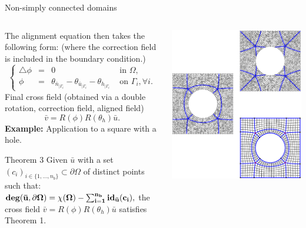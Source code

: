 \documentclass[compress,10pt,aspectratio=169]{beamer}
\begin{document}
\begin{frame}{Non-simply connected domains}

\vspace{-0.3cm}
\small
\begin{columns}
\begin{column}{0.68\textwidth}
The alignment equation then takes the following form: {\color{onera_gray} (where the correction field is included in the boundary condition.)}
\begin{equation*}
\left\{
\begin{array}{lcll}
    \triangle\phi& =& 0& \mbox{ in }\Omega,\\[0.25cm]
    \phi &=& \theta_{\bar{n}_{|\Gamma_i}}-\theta_{\bar{u}_{|\Gamma_i}}-\theta_{h_{|\Gamma_i}}& \mbox{ on }\Gamma_i, \forall i.
\end{array}
\right.
\end{equation*}
Final cross field {\color{onera_gray} (obtained via a double rotation, correction field, aligned field)}
\begin{equation*}
\bar{v}=R(\phi)R(\theta_h)\bar{u}.
\end{equation*}
\textbf{Example:} Application to a square with a hole.\\\vspace{0.2cm}
\begin{onerablock}{
\small Theorem 3}
Given $\bar{u}$ with a set $(c_i)_{i\in\{1,\dots,n_b\}}\subset\partial\Omega$ of distinct points such that:
$
{\bf deg(\bar{u}, \partial\Omega) = \chi(\Omega)-\sum_{i=1}^{n_b} id_{\bar{u}}(c_i),}
$
the cross field $\bar{v}=R(\phi)R(\theta_h)\bar{u}$ satisfies Theorem 1.
\end{onerablock}
\end{column}
\begin{column}{0.32\textwidth}
\centering
\includegraphics[scale=0.27]{images/image.eps}

\end{column}
\end{columns}
\end{frame}
\end{document}
